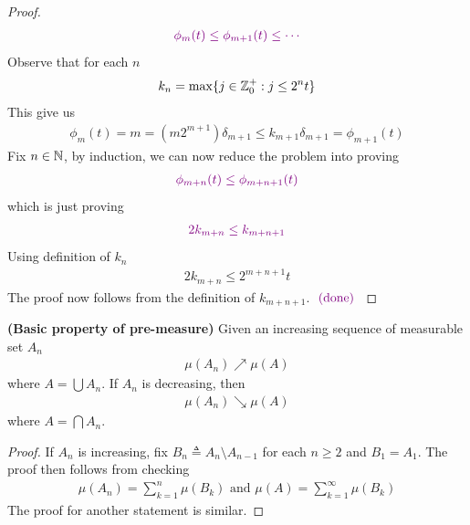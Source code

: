 \documentclass{report}
\begin{document}
\begin{proof}
\begin{align*}
\textcolor{violet}{\phi_m(t)\leq \phi_{m+1}(t)\leq \cdots }
\end{align*}
Observe that for each $n$
\begin{align*}
k_n= \max \{ j\in\mathbb{Z}_0^+: j\leq 2^nt  \}
\end{align*}
This give us 
\begin{align*}
\phi_m(t)=m= (m2^{m+1}) \delta_{m+1}\leq k_{m+1} \delta_{m+1}=\phi_{m+1}(t)
\end{align*}
Fix $n\in\mathbb{N}$, by induction, we can now reduce the problem into proving 
\begin{align*}
\textcolor{violet}{\phi_{m+n}(t)\leq \phi_{m+n+1}(t)}
\end{align*}
which is just proving 
\begin{align*}
\textcolor{violet}{2k_{m+n}\leq k_{m+n+1}}
\end{align*}
Using definition of $k_n$
\begin{align*}
2k_{m+n}\leq 2^{m+n+1}t 
\end{align*}
The proof now follows from the definition of $k_{m+n+1}$. $\textcolor{violet}{\text{ (done) }}$
\end{proof}

\begin{theorem}
\label{Bppm}
\textbf{(Basic property of pre-measure)} Given an increasing sequence of measurable set $A_n$ 
 \begin{align*}
\mu (A_n)\nearrow \mu (A)
\end{align*}
where $A=\bigcup A_n$. If $A_n$ is decreasing, then 
\begin{align*}
\mu (A_n)\searrow \mu (A)
\end{align*}
where $A=\bigcap A_n$.
\end{theorem}
\begin{proof}
If $A_n$ is increasing, fix $B_n\triangleq A_n\setminus A_{n-1}$ for each $n\geq 2$ and $B_1=A_1$. The proof then follows from checking 
\begin{align*}
\mu (A_n)= \sum_{k=1}^n \mu (B_k)\text{ and }\mu(A)=\sum_{k=1}^{\infty} \mu (B_k)
\end{align*}
The proof for another statement is similar.
\end{proof}
\end{document}
